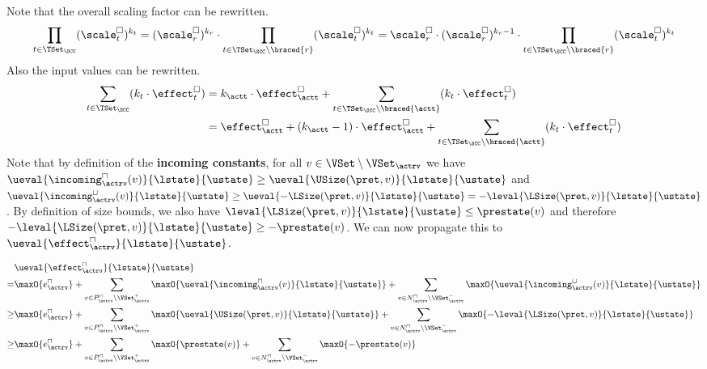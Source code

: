 Note that the overall scaling factor can be rewritten.
\begin{equation} \label{eq:scaling_factor_reduction}
  \prod_{t \in \TSet_\SCC} (\scale^\square_t)^{k_t} = (\scale^\square_r)^{k_r} \cdot \prod_{t \in \TSet_\SCC \setminus \braced{r}} (\scale^\square_t)^{k_t} = \scale^\square_r \cdot (\scale^\square_r)^{k_r - 1} \cdot \prod_{t \in \TSet_\SCC \setminus \braced{r}} (\scale^\square_t)^{k_t}
\end{equation}
Also the input values can be rewritten.
\begin{equation} \label{eq:input_reduction}
  \begin{split}
  \sum_{t \in \TSet_\SCC} (k_t \cdot \effect^\square_t)
  & = k_\actt \cdot \effect^\square_\actt + \sum_{t \in \TSet_\SCC \setminus \braced{\actt}} (k_t \cdot \effect^\square_t) \\
  & = \effect^\square_\actt
    + (k_\actt - 1) \cdot \effect^\square_\actt
    + \sum_{t \in \TSet_\SCC \setminus \braced{\actt}} (k_t \cdot \effect^\square_t)
  \end{split}
\end{equation}
Note that by definition of the \textbf{incoming constants}, for all $v \in \VSet \setminus \VSet_\actrv$ we have $\ueval{\incoming^\sqcap_\actrv(v)}{\lstate}{\ustate} \geq \ueval{\USize(\pret, v)}{\lstate}{\ustate}$ and $\ueval{\incoming^\sqcup_\actrv(v)}{\lstate}{\ustate} \geq \ueval{-\LSize(\pret, v)}{\lstate}{\ustate} = -\leval{\LSize(\pret, v)}{\lstate}{\ustate}$.
By definition of size bounds, we also have $\leval{\LSize(\pret, v)}{\lstate}{\ustate} \leq \prestate(v)$ and therefore $-\leval{\LSize(\pret, v)}{\lstate}{\ustate} \geq -\prestate(v)$.
We can now propagate this to $\ueval{\effect^\sqcap_\actrv}{\lstate}{\ustate}$.

\begin{equation} \label{eq:input_rv_reduction_upper}
  \begin{split}
  & \ueval{\effect^\sqcap_\actrv}{\lstate}{\ustate} \\
  = & \maxO{e^{\sqcap}_\actrv}
    + \sum_{v \in P_\actrv^\sqcap \setminus \VSet^+_\actrv} \maxO{\ueval{\incoming^\sqcap_\actrv(v)}{\lstate}{\ustate}}
    + \sum_{v \in N_\actrv^\sqcap \setminus \VSet^-_\actrv} \maxO{\ueval{\incoming^\sqcup_\actrv(v)}{\lstate}{\ustate}} \\
  \geq & \maxO{e^{\sqcap}_\actrv}
    + \sum_{v \in P_\actrv^\sqcap \setminus \VSet^+_\actrv} \maxO{\ueval{\USize(\pret, v)}{\lstate}{\ustate}}
    + \sum_{v \in N_\actrv^\sqcap \setminus \VSet^-_\actrv} \maxO{-\leval{\LSize(\pret, v)}{\lstate}{\ustate}} \\
  \geq & \maxO{e^{\sqcap}_\actrv}
    + \sum_{v \in P_\actrv^\sqcap \setminus \VSet^+_\actrv} \maxO{\prestate(v)}
    + \sum_{v \in N_\actrv^\sqcap \setminus \VSet^-_\actrv} \maxO{-\prestate(v)} \\
  \end{split}
\end{equation}


